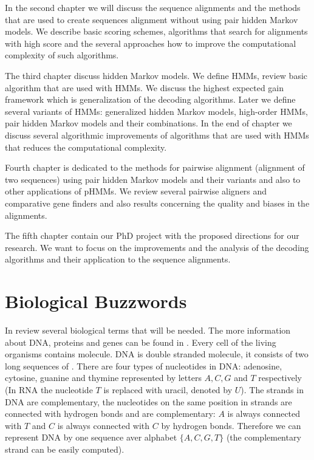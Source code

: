 In the second chapter we will discuss the sequence alignments and the methods
that are used to create sequences alignment without using pair hidden Markov
models. We describe basic scoring schemes, algorithms that search for alignments
with high score and the several approaches how to improve the computational
complexity of such algorithms.

The third chapter discuss hidden Markov models. We define HMMs, review basic
algorithm that are used with HMMs. We discuss the highest expected gain
framework which is generalization of the decoding algorithms. Later we define
several variants of HMMs: generalized hidden Markov models, high-order HMMs,
pair hidden Markov models and their combinations. In the end of chapter we
discuss several algorithmic improvements of algorithms that are used with HMMs
that reduces the computational complexity.

Fourth chapter is dedicated to the methods for pairwise alignment (alignment of
two sequences) using pair hidden Markov models and their variants and also to
other applications of pHMMs. We review several pairwise aligners and comparative
gene finders and also results concerning the quality and biases in the
alignments.

The fifth chapter contain our PhD project with the proposed directions for our
research. We want to focus on the improvements and the analysis of the decoding
algorithms and their application to the sequence alignments. 

\section{Biological Buzzwords}



In review several biological terms that will be needed. The more information
about DNA, proteins and genes can be found in
\cite{BiologyForDummies,UnderstandingBioinformatics}.
Every cell of the living organisms contains  molecule. DNA is
double stranded molecule, it consists of two long sequences of
. There are four types of nucleotides in DNA: adenosine,
cytosine, guanine and thymine represented by letters $A,C,G$ and $T$
respectively (In RNA the nucleotide $T$ is replaced with uracil, denoted by
$U$). The strands in DNA are complementary, the nucleotides on the same position
in strands are connected with hydrogen bonds and are complementary: $A$ is
always connected with $T$ and $C$ is always connected with $C$ by hydrogen
bonds. Therefore we can represent DNA by one sequence aver alphabet
$\{A,C,G,T\}$ (the complementary strand can be easily computed).

